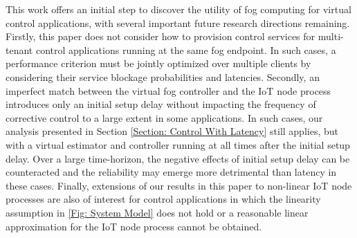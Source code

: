 \documentclass[10pt, journal, letterpaper]{IEEEtran}
\newcommand{\1}{\ensuremath{\mathbf{1}}} %
\begin{document}
This work offers an initial step to discover the utility of fog computing for virtual control applications, with several important future research directions remaining. Firstly, this paper does not consider how to provision control services for multi-tenant control applications running at the same fog endpoint. In such cases, a performance criterion must be jointly optimized over multiple clients by considering their service blockage probabilities and latencies. Secondly, an imperfect match between the virtual fog controller and the IoT node process introduces only an initial setup delay without impacting the frequency of corrective control to a large extent in some applications. In such cases, our analysis presented in Section \ref{Section: Control With Latency} still applies, but with a virtual estimator and controller running at all times after the initial setup delay. Over a large time-horizon, the negative effects of initial setup delay can be counteracted and the reliability may emerge more detrimental than latency in these cases. Finally, extensions of our results in this paper to non-linear IoT node processes are also of interest for control applications in which the linearity assumption in \eqref{Fig: System Model} does not hold or a reasonable linear approximation for the IoT node process cannot be obtained.






\end{document}
